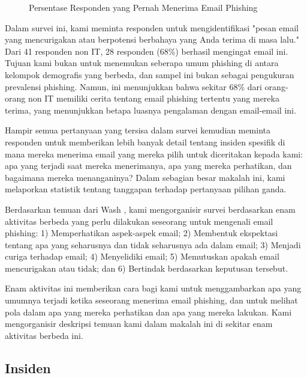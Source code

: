 \documentclass[lettersize,journal]{IEEEtran}
\begin{document}
\begin{figure}[h]
  \centering
  \caption{Persentase Responden yang Pernah Menerima Email Phishing}
  \label{fig:phishing_experience}
\end{figure}

Dalam survei ini, kami meminta responden untuk mengidentifikasi "pesan email
yang mencurigakan atau berpotensi berbahaya yang Anda terima di masa lalu."
Dari 41 responden non IT, 28 responden (68\%) berhasil mengingat email ini.
Tujuan kami bukan untuk menemukan seberapa umum phishing di antara kelompok
demografis yang berbeda, dan sampel ini bukan sebagai pengukuran prevalensi
phishing. Namun, ini menunjukkan bahwa sekitar 68\% dari orang-orang non IT
memiliki cerita tentang email phishing tertentu yang mereka terima, yang
menunjukkan betapa luasnya pengalaman dengan email-email ini.

Hampir semua pertanyaan yang tersisa dalam survei kemudian meminta responden
untuk memberikan lebih banyak detail tentang insiden spesifik di mana mereka
menerima email yang mereka pilih untuk diceritakan kepada kami: apa yang
terjadi saat mereka menerimanya, apa yang mereka perhatikan, dan bagaimana
mereka menanganinya? Dalam sebagian besar makalah ini, kami melaporkan
statistik tentang tanggapan terhadap pertanyaan pilihan ganda.

Berdasarkan temuan dari Wash \cite{tigaempat}, kami mengorganisir survei
berdasarkan enam aktivitas berbeda yang perlu dilakukan seseorang untuk
mengenali email phishing: 1) Memperhatikan aspek-aspek email; 2) Membentuk
ekspektasi tentang apa yang seharusnya dan tidak seharusnya ada dalam email; 3)
Menjadi curiga terhadap email; 4) Menyelidiki email; 5) Memutuskan apakah email
mencurigakan atau tidak; dan 6) Bertindak berdasarkan keputusan tersebut.

Enam aktivitas ini memberikan cara bagi kami untuk menggambarkan apa yang
umumnya terjadi ketika seseorang menerima email phishing, dan untuk melihat
pola dalam apa yang mereka perhatikan dan apa yang mereka lakukan. Kami
mengorganisir deskripsi temuan kami dalam makalah ini di sekitar enam aktivitas
berbeda ini.

\subsection{Insiden}
\end{document}
